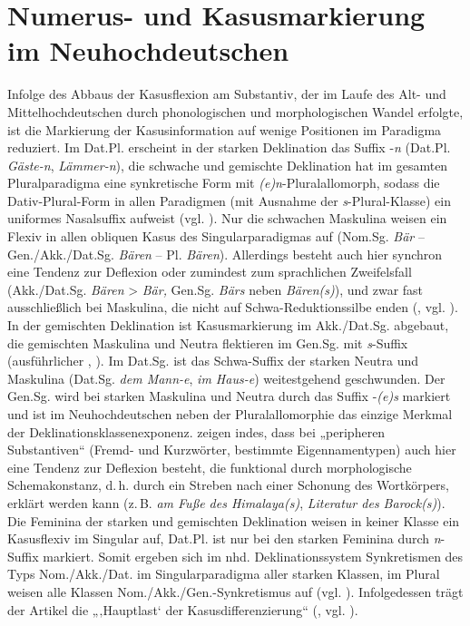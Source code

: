 \section{Numerus{}- und Kasusmarkierung im Neuhochdeutschen}
\label{sec:4.1}
Infolge des Abbaus der Kasusflexion am Substantiv, der im Laufe des Alt- und Mittelhochdeutschen durch phonologischen und morphologischen Wandel erfolgte, ist die Markierung der Kasusinformation auf wenige Positionen im Paradigma reduziert. Im Dat.Pl. erscheint in der starken Deklination das Suffix -\textit{n} (Dat.Pl. \textit{Gäste-n}, \textit{Lämmer-n}), die schwache und gemischte Deklination hat im gesamten Pluralparadigma eine synkretische Form mit \textit{(e)n}{}-Pluralallomorph, sodass die Dativ-Plural-Form in allen Paradigmen (mit Ausnahme der \textit{s}{}-Plural-Klasse) ein uniformes Nasalsuffix aufweist (vgl. \citealt[91]{Kürschner2008a}). Nur die schwachen Maskulina weisen ein Flexiv in allen obliquen Kasus des Singularparadigmas auf (Nom.Sg. \textit{Bär} -- Gen./Akk./Dat.Sg. \textit{Bären} -- Pl. \textit{Bären}). Allerdings besteht auch hier synchron eine Tendenz zur Deflexion oder zumindest zum sprachlichen Zweifelsfall (Akk./Dat.Sg. \textit{Bären} > \textit{Bär,} Gen.Sg. \textit{Bärs} neben \textit{Bären(s)}), und zwar fast ausschließlich bei Maskulina, die nicht auf Schwa-Reduktionssilbe enden (\citealt{Thieroff2003}, vgl. \citealt[212]{DammelGillmann2014}). In der gemischten Deklination ist Kasusmarkierung im Akk./Dat.Sg. abgebaut, die gemischten Maskulina und Neutra flektieren im Gen.Sg. mit \textit{s}{}-Suffix (ausführlicher \citealt[§36--37]{Paul1968}, \citealt{Ronneberger-Sibold2018}). Im Dat.Sg. ist das Schwa-Suffix der starken Neutra und Maskulina (Dat.Sg. \textit{dem Mann-e}, \textit{im Haus-e}) weitestgehend geschwunden. Der Gen.Sg. wird bei starken Maskulina und Neutra durch das Suffix -\textit{(e)s} markiert und ist im Neuhochdeutschen neben der Pluralallomorphie das einzige Merkmal der Deklinationsklassenexponenz. \citet{AckermannZimmer2017} zeigen indes, dass bei „peripheren Substantiven“ (Fremd- und Kurzwörter, bestimmte Eigennamentypen) auch hier eine Tendenz zur Deflexion besteht, die funktional durch morphologische Schemakonstanz, d.\,h. durch ein Streben nach einer Schonung des Wortkörpers, erklärt werden kann (z.\,B. \textit{am Fuße des Himalaya(s)}, \textit{Literatur des Barock(s)}). Die Feminina der starken und gemischten Deklination weisen in keiner Klasse ein Kasusflexiv im Singular auf, Dat.Pl. ist nur bei den starken Feminina durch \textit{n}{}-Suffix markiert. Somit ergeben sich im nhd. Deklinationssystem Synkretismen des Typs Nom./Akk./Dat. im Singularparadigma aller starken Klassen, im Plural weisen alle Klassen Nom./Akk./Gen.-Synkretismus auf (vgl. \citealt[95]{Kürschner2008a}). Infolgedessen trägt der Artikel die „‚Hauptlast‘ der Kasusdifferenzierung“ (\citealt[140]{Wiese2000}, vgl. ).

